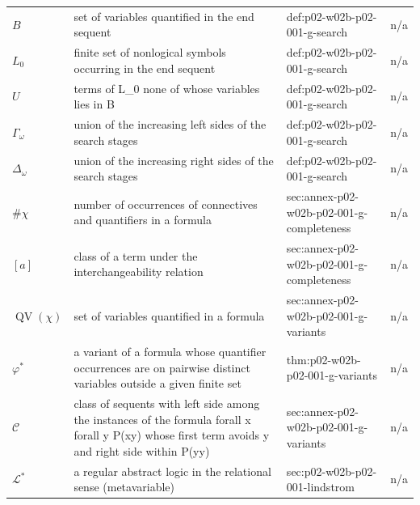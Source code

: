 \begin{longtable}{@{}p{}p{}p{}p{}@{}}
\(B\) & set of variables quantified in the end sequent & def:\allowbreak{}p02-\allowbreak{}w02b-\allowbreak{}p02-\allowbreak{}001-\allowbreak{}g-\allowbreak{}search & n/a \\
\(L_0\) & finite set of nonlogical symbols occurring in the end sequent & def:\allowbreak{}p02-\allowbreak{}w02b-\allowbreak{}p02-\allowbreak{}001-\allowbreak{}g-\allowbreak{}search & n/a \\
\(U\) & terms of L\_0 none of whose variables lies in B & def:\allowbreak{}p02-\allowbreak{}w02b-\allowbreak{}p02-\allowbreak{}001-\allowbreak{}g-\allowbreak{}search & n/a \\
\(\Gamma_\omega\) & union of the increasing left sides of the search stages & def:\allowbreak{}p02-\allowbreak{}w02b-\allowbreak{}p02-\allowbreak{}001-\allowbreak{}g-\allowbreak{}search & n/a \\
\(\Delta_\omega\) & union of the increasing right sides of the search stages & def:\allowbreak{}p02-\allowbreak{}w02b-\allowbreak{}p02-\allowbreak{}001-\allowbreak{}g-\allowbreak{}search & n/a \\
\(\#\chi\) & number of occurrences of connectives and quantifiers in a formula & sec:\allowbreak{}annex-\allowbreak{}p02-\allowbreak{}w02b-\allowbreak{}p02-\allowbreak{}001-\allowbreak{}g-\allowbreak{}completeness & n/a \\
\([a]\) & class of a term under the interchangeability relation & sec:\allowbreak{}annex-\allowbreak{}p02-\allowbreak{}w02b-\allowbreak{}p02-\allowbreak{}001-\allowbreak{}g-\allowbreak{}completeness & n/a \\
\(\operatorname{QV}(\chi)\) & set of variables quantified in a formula & sec:\allowbreak{}annex-\allowbreak{}p02-\allowbreak{}w02b-\allowbreak{}p02-\allowbreak{}001-\allowbreak{}g-\allowbreak{}variants & n/a \\
\(\varphi^{*}\) & a variant of a formula whose quantifier occurrences are on pairwise distinct variables outside a given finite set & thm:\allowbreak{}p02-\allowbreak{}w02b-\allowbreak{}p02-\allowbreak{}001-\allowbreak{}g-\allowbreak{}variants & n/a \\
\(\mathcal C\) & class of sequents with left side among the instances of the formula forall x forall y P(xy) whose first term avoids y and right side within {P(yy)} & sec:\allowbreak{}annex-\allowbreak{}p02-\allowbreak{}w02b-\allowbreak{}p02-\allowbreak{}001-\allowbreak{}g-\allowbreak{}variants & n/a \\
\(\mathcal L^{\ast}\) & a regular abstract logic in the relational sense (metavariable) & sec:\allowbreak{}p02-\allowbreak{}w02b-\allowbreak{}p02-\allowbreak{}001-\allowbreak{}lindstrom & n/a \\

\end{longtable}

